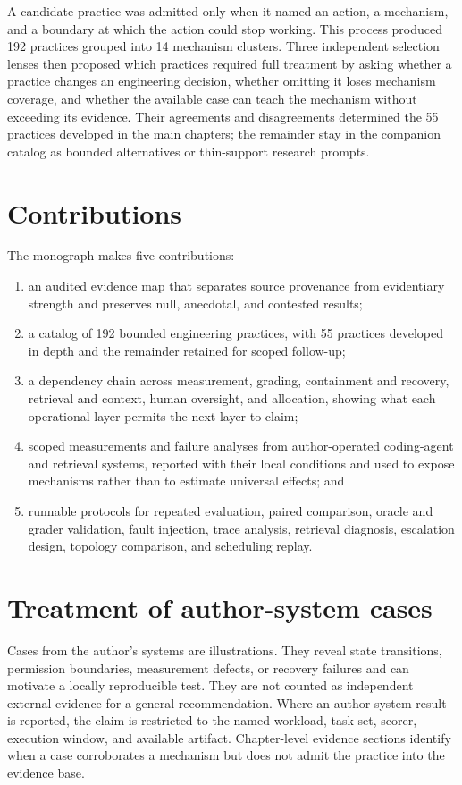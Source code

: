 A candidate practice was admitted only when it named an action, a mechanism, and a boundary at which the action could stop working. This process produced 192 practices grouped into 14 mechanism clusters. Three independent selection lenses then proposed which practices required full treatment by asking whether a practice changes an engineering decision, whether omitting it loses mechanism coverage, and whether the available case can teach the mechanism without exceeding its evidence. Their agreements and disagreements determined the 55 practices developed in the main chapters; the remainder stay in the companion catalog as bounded alternatives or thin-support research prompts.

\section{Contributions}

The monograph makes five contributions:

\begin{enumerate}
  \item an audited evidence map that separates source provenance from evidentiary strength and preserves null, anecdotal, and contested results;
  \item a catalog of 192 bounded engineering practices, with 55 practices developed in depth and the remainder retained for scoped follow-up;
  \item a dependency chain across measurement, grading, containment and recovery, retrieval and context, human oversight, and allocation, showing what each operational layer permits the next layer to claim;
  \item scoped measurements and failure analyses from author-operated coding-agent and retrieval systems, reported with their local conditions and used to expose mechanisms rather than to estimate universal effects; and
  \item runnable protocols for repeated evaluation, paired comparison, oracle and grader validation, fault injection, trace analysis, retrieval diagnosis, escalation design, topology comparison, and scheduling replay.
\end{enumerate}

\section{Treatment of author-system cases}

Cases from the author's systems are illustrations. They reveal state transitions, permission boundaries, measurement defects, or recovery failures and can motivate a locally reproducible test. They are not counted as independent external evidence for a general recommendation. Where an author-system result is reported, the claim is restricted to the named workload, task set, scorer, execution window, and available artifact. Chapter-level evidence sections identify when a case corroborates a mechanism but does not admit the practice into the evidence base.


